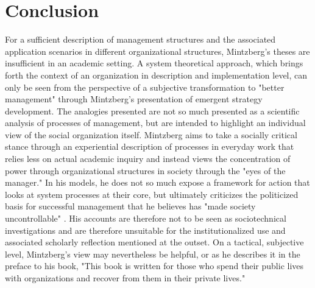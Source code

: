 \documentclass[a4paper,12pt]{article}
\begin{document}
\section{Conclusion}

For a sufficient description of management structures and the associated
application scenarios in different organizational structures, Mintzberg's
theses are insufficient in an academic setting. A system theoretical approach,
which brings forth the context of an organization in description and
implementation level, can only be seen from the perspective of a subjective
transformation to "better management" through Mintzberg's presentation of
emergent strategy development. The analogies presented are not so much
presented as a scientific analysis of processes of management, but are
intended to highlight an individual view of the social organization
itself. Mintzberg aims to take a socially critical stance through an
experiential description of processes in everyday work that relies less on
actual academic inquiry and instead views the concentration of power through
organizational structures in society through the "eyes of the manager." In his
models, he does not so much expose a framework for action that looks at system
processes at their core, but ultimately criticizes the politicized basis for
successful management that he believes has "made society uncontrollable"
\cite[p. 331]{Mintzberg}. His accounts are therefore not to be seen as
sociotechnical investigations and are therefore unsuitable for the
institutionalized use and associated scholarly reflection mentioned at the
outset. On a tactical, subjective level, Mintzberg's view may nevertheless be
helpful, or as he describes it in the preface to his book, "This book is
written for those who spend their public lives with organizations and recover
from them in their private lives."

\newpage
\end{document}
